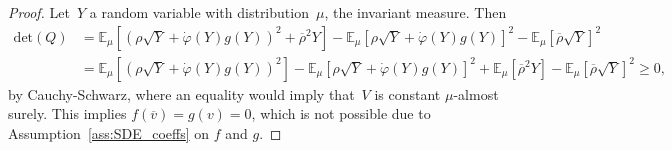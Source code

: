 \documentclass{amsart}[11pt]
\numberwithin{equation}{section}
\numberwithin{theorem}{subsection}
\numberwithin{proposition}{subsection}
\numberwithin{definition}{subsection}
\numberwithin{lemma}{subsection}
\numberwithin{assumption}{subsection}
\newcommand{\EE}{\mathbb{E}}
\newcommand{\brho}{\overline{\rho}}
\begin{document}
\begin{proof}
Let~$Y$ a random variable with distribution~$\mu$, the invariant measure. Then 
\begin{align*}
\mathrm{det}(Q) &= \EE_\mu\left[ \left( \rho\sqrt{Y} + \dot{\varphi}(Y)g(Y)\right)^2 +\brho^2 Y \right ]
- \EE_\mu\left[ \rho\sqrt{Y} + \dot{\varphi}(Y)g(Y) \right ]^2
- \EE_\mu\left[ \brho \sqrt{Y} \right ]^2 \\
&= \EE_\mu\left[ \left( \rho\sqrt{Y} + \dot{\varphi}(Y)g(Y)\right)^2 \right ] - \EE_\mu\left[ \rho\sqrt{Y} + \dot{\varphi}(Y)g(Y) \right ]^2 + \EE_\mu\left [ \brho^2 Y\right ] - \EE_\mu\left[ \brho \sqrt{Y} \right ]^2
\geq 0,
\end{align*}
by Cauchy-Schwarz, where an equality would imply that~$V$ is constant $\mu$-almost surely. 
This implies $f(\overline{v})=g(v)=0$, which is not possible due to Assumption~\ref{ass:SDE_coeffs} on $f$ and $g$. 
\end{proof}

\end{document}
